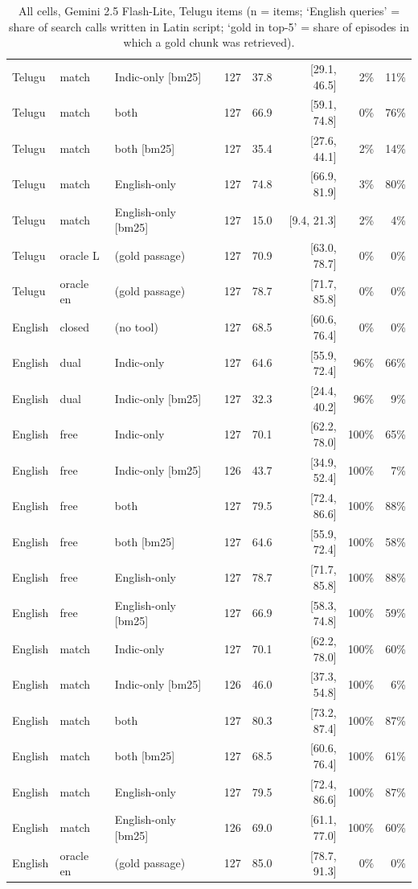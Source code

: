 \begin{table}[htbp]
\begin{tabular}{lllrrrrr}
Telugu & match & Indic-only [bm25] & 127 & 37.8 & [29.1, 46.5] & 2\% & 11\% \\
Telugu & match & both & 127 & 66.9 & [59.1, 74.8] & 0\% & 76\% \\
Telugu & match & both [bm25] & 127 & 35.4 & [27.6, 44.1] & 2\% & 14\% \\
Telugu & match & English-only & 127 & 74.8 & [66.9, 81.9] & 3\% & 80\% \\
Telugu & match & English-only [bm25] & 127 & 15.0 & [9.4, 21.3] & 2\% & 4\% \\
Telugu & oracle L & (gold passage) & 127 & 70.9 & [63.0, 78.7] & 0\% & 0\% \\
Telugu & oracle en & (gold passage) & 127 & 78.7 & [71.7, 85.8] & 0\% & 0\% \\
English & closed & (no tool) & 127 & 68.5 & [60.6, 76.4] & 0\% & 0\% \\
English & dual & Indic-only & 127 & 64.6 & [55.9, 72.4] & 96\% & 66\% \\
English & dual & Indic-only [bm25] & 127 & 32.3 & [24.4, 40.2] & 96\% & 9\% \\
English & free & Indic-only & 127 & 70.1 & [62.2, 78.0] & 100\% & 65\% \\
English & free & Indic-only [bm25] & 126 & 43.7 & [34.9, 52.4] & 100\% & 7\% \\
English & free & both & 127 & 79.5 & [72.4, 86.6] & 100\% & 88\% \\
English & free & both [bm25] & 127 & 64.6 & [55.9, 72.4] & 100\% & 58\% \\
English & free & English-only & 127 & 78.7 & [71.7, 85.8] & 100\% & 88\% \\
English & free & English-only [bm25] & 127 & 66.9 & [58.3, 74.8] & 100\% & 59\% \\
English & match & Indic-only & 127 & 70.1 & [62.2, 78.0] & 100\% & 60\% \\
English & match & Indic-only [bm25] & 126 & 46.0 & [37.3, 54.8] & 100\% & 6\% \\
English & match & both & 127 & 80.3 & [73.2, 87.4] & 100\% & 87\% \\
English & match & both [bm25] & 127 & 68.5 & [60.6, 76.4] & 100\% & 61\% \\
English & match & English-only & 127 & 79.5 & [72.4, 86.6] & 100\% & 87\% \\
English & match & English-only [bm25] & 126 & 69.0 & [61.1, 77.0] & 100\% & 60\% \\
English & oracle en & (gold passage) & 127 & 85.0 & [78.7, 91.3] & 0\% & 0\% \\
\bottomrule
\end{tabular}
\caption{All cells, Gemini 2.5 Flash-Lite, Telugu items (n = items; `English queries' = share of search calls written in Latin script; `gold in top-5' = share of episodes in which a gold chunk was retrieved).}
\end{table}

